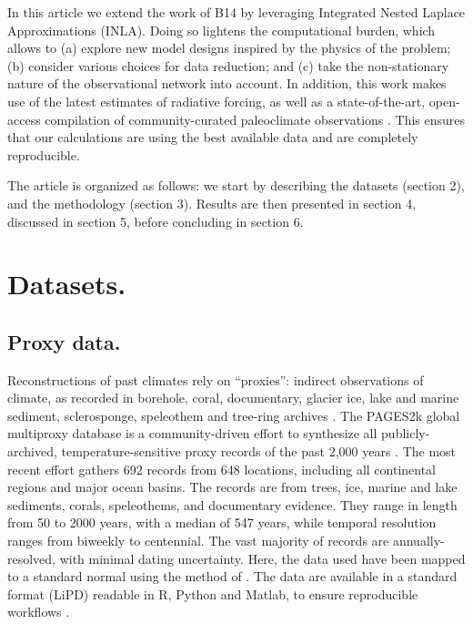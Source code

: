 \documentclass[12pt]{amsart}
\theoremstyle{plain}
\theoremstyle{definition}
\theoremstyle{remark}
\begin{document}
In this article we extend the work of B14 by leveraging Integrated Nested Laplace
Approximations (INLA). Doing so lightens the computational burden, which allows to (a) explore new model designs inspired by the physics of the problem; (b) consider various choices for data reduction; and (c) take the non-stationary nature of the observational network into account.  In addition, this work makes use of the latest estimates of radiative forcing, as well as a state-of-the-art, open-access compilation of community-curated paleoclimate observations \citep{PAGES2kSD2017short}. This ensures that our calculations are using the best available data and are completely reproducible.  

The article is organized as follows: we start by describing the datasets (section 2), and the methodology (section 3). Results are then presented in section 4, discussed in section 5, before concluding in section 6. 

\section{Datasets.}
\label{sec:data}

\subsection{Proxy data.}
Reconstructions of past climates rely on ``proxies'': indirect observations of climate, as recorded in borehole, coral, documentary, glacier
ice, lake and marine sediment, sclerosponge, speleothem and tree-ring archives
\citep{Jones_Holocene09}. The PAGES2k global multiproxy database is a community-driven effort to
synthesize all publicly-archived, temperature-sensitive proxy records of the
past 2,000 years \citep{PAGES2kSD2017short}. The most recent effort gathers 692 records from 648 locations, including all continental regions and major ocean basins. The records are from trees, ice, marine and lake sediments, corals, speleothems, and documentary evidence. They range in length from 50 to 2000 years, with a median of 547 years, while temporal resolution ranges from biweekly to centennial.
  The vast majority of records are annually-resolved, with minimal dating uncertainty. Here, the data used have been mapped to a standard normal using the method of \cite{vanAlbada2007}. The data are available in a standard format (LiPD) readable in R, Python and Matlab, to ensure reproducible workflows \citep{lipd_cp}.   
\end{document}
